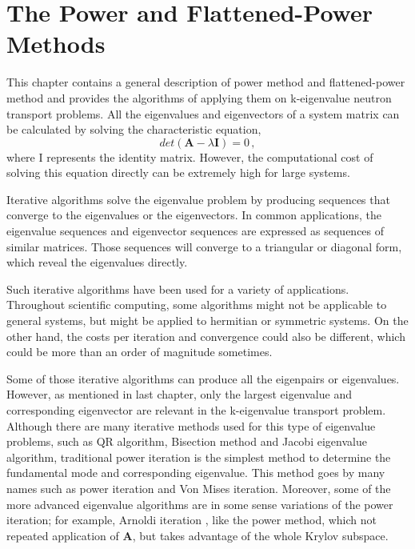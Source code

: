 \cleardoublepage

\chapter{The Power and Flattened-Power Methods}
\label{chapter:PM}

This chapter contains a general description of power method and flattened-power method and provides the algorithms of applying them on k-eigenvalue neutron transport problems.
All the eigenvalues and eigenvectors of a system matrix can be calculated by solving the characteristic equation,
\begin{equation}
det(\mathbf{A} -\lambda \mathbf{I} ) = 0 \, ,
\label{eq:characteristic}
\end{equation}
where I represents the identity matrix.
However, the computational cost of solving this equation directly can be extremely high for large systems. 

Iterative algorithms solve the eigenvalue problem by producing sequences that converge to the eigenvalues or the eigenvectors.
In common applications, the eigenvalue sequences and eigenvector sequences are expressed as sequences of similar matrices. 
Those sequences will converge to a triangular or diagonal form, which reveal the eigenvalues directly. 

Such iterative algorithms have been used for a variety of applications.
Throughout scientific computing, some algorithms might not be applicable to general systems, but might be applied to hermitian or symmetric systems.
On the other hand, the costs per iteration and convergence could also be different, which could be more than an order of magnitude sometimes. 

Some of those iterative algorithms can produce all the eigenpairs or eigenvalues. 
However, as mentioned in last chapter, only the largest eigenvalue and corresponding eigenvector are relevant in the k-eigenvalue transport problem.
Although there are many iterative methods used for this type of eigenvalue problems, such as QR algorithm, Bisection method and Jacobi eigenvalue algorithm, traditional power iteration is the simplest method to determine the fundamental mode and corresponding eigenvalue.
This method goes by many names such as power iteration and Von Mises iteration\cite{mises1929praktische}.
Moreover, some of the more advanced eigenvalue algorithms are in some sense variations of the power iteration; for example, Arnoldi iteration \cite{arnoldi1951principle}, like the power method, which not repeated application of $\mathbf{A}$, but takes advantage of the whole Krylov subspace. 

